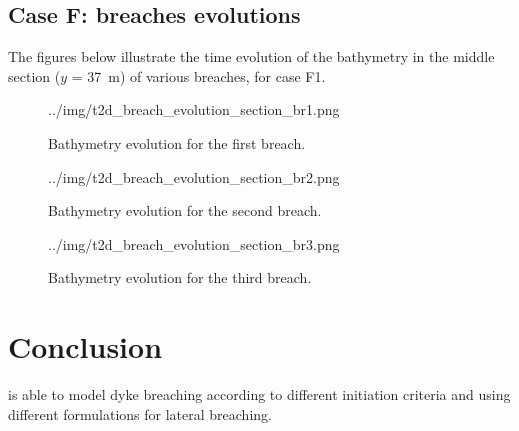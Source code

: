 \subsection{Case F: breaches evolutions}
The figures below illustrate the time evolution of the bathymetry in the middle
section ($y$ = 37~m) of various breaches, for case F1.
\begin{figure}[H]
 \centering
 {../img/t2d_breach_evolution_section_br1.png}
 \caption{Bathymetry evolution for the first breach.}
 \label{fig:breach:br1:evol}
\end{figure}

\begin{figure}[H]
 \centering
 {../img/t2d_breach_evolution_section_br2.png}
 \caption{Bathymetry evolution for the second breach.}
 \label{fig:breach:br2:evol}
\end{figure}

\begin{figure}[H]
 \centering
 {../img/t2d_breach_evolution_section_br3.png}
 \caption{Bathymetry evolution for the third breach.}
 \label{fig:breach:br3:evol}
\end{figure}
\section{Conclusion}
 is able to model dyke breaching according to different initiation criteria and using different formulations for lateral breaching.

